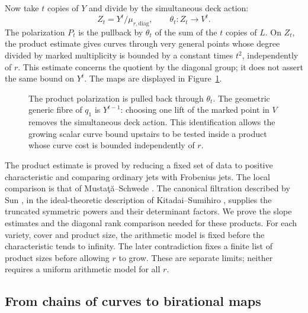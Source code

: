 Now take $t$ copies of $Y$ and divide by the simultaneous deck action:
\[
 Z_t=Y^t/\mu_{r,\mathrm{diag}},\qquad
 \theta_t:Z_t\longrightarrow V^t.
\]
The polarization $P_t$ is the pullback by $\theta_t$ of the sum of
the $t$ copies of $L$. On $Z_t$, the product estimate gives curves
through very general points whose degree divided by marked
multiplicity is bounded by a constant times $t^2$, independently of
$r$. This estimate concerns the quotient by the diagonal group;
it does not assert the same bound on $Y^t$.
The maps are displayed in Figure~\ref{fig:diagonal-cover}.

\begin{figure}[ht]
\centering
{}
\caption{The product polarization is pulled back through $\theta_t$.
The geometric generic fibre of $q_1$ is $Y^{t-1}$: choosing one lift of
the marked point in $V$ removes the simultaneous deck action. This
identification allows the growing scalar curve bound upstairs to be
tested inside a product whose curve cost is bounded independently of $r$.}
\label{fig:diagonal-cover}
\end{figure}


The product estimate is proved by reducing a fixed set of data to
positive characteristic and comparing ordinary jets with Frobenius
jets. The local comparison is that of Musta\c{t}\u{a}--Schwede
\cite[Equation (2.8)]{MustataSchwede2014}. The canonical filtration described by Sun
\cite[Theorem 3.7 and Lemma 4.2]{Sun2008}, in the ideal-theoretic
description of Kitadai--Sumihiro
\cite[Definition 3.1 and Remark 3.2]{KitadaiSumihiro2008}, supplies
the truncated symmetric powers and their determinant factors.
We prove the slope estimates and the diagonal rank comparison
needed for these products. For each variety, cover and product size,
the arithmetic model is fixed before the characteristic tends to
infinity. The later contradiction fixes a finite list of product
sizes before allowing $r$ to grow. These are separate limits;
neither requires a uniform arithmetic model for all $r$.

\subsection{From chains of curves to birational maps}

